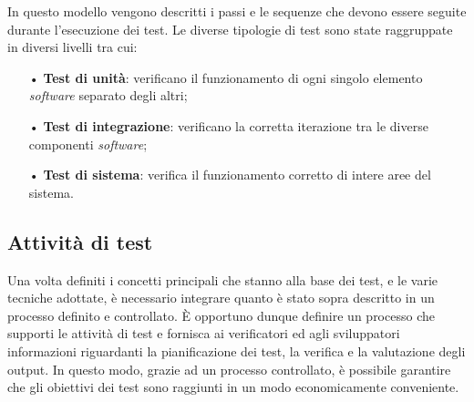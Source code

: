 In questo modello vengono descritti i passi e le sequenze che devono essere seguite durante l'esecuzione dei test. Le diverse tipologie di test sono state raggruppate in diversi livelli tra cui:
\begin{itemize}
\item[•] \textbf{Test di unità}: verificano il funzionamento di ogni singolo elemento \textit{software} separato degli altri;

\item[•] \textbf{Test di integrazione}: verificano la corretta iterazione tra le diverse componenti \textit{software};

\item[•] \textbf{Test di sistema}: verifica il funzionamento corretto di intere aree del sistema.
\end{itemize}

\subsection{Attività di test}

Una volta definiti i concetti principali che stanno alla base dei test, e le varie tecniche adottate, è necessario integrare quanto è stato sopra descritto in un processo definito e controllato. È opportuno dunque definire un processo che supporti le attività di test e fornisca ai verificatori ed agli sviluppatori informazioni riguardanti la pianificazione dei test, la verifica e la valutazione degli output. In questo modo, grazie ad un processo controllato, è possibile garantire che gli obiettivi dei test sono raggiunti in un modo economicamente conveniente.


